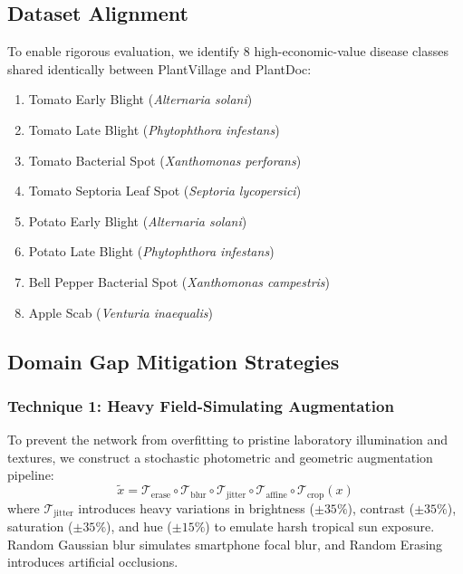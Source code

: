 \documentclass[twoside,a4paper,11pt]{article}
\begin{document}
\subsection{Dataset Alignment}
To enable rigorous evaluation, we identify 8 high-economic-value disease classes shared identically between PlantVillage and PlantDoc:
\begin{enumerate}
    \item Tomato Early Blight (\textit{Alternaria solani})
    \item Tomato Late Blight (\textit{Phytophthora infestans})
    \item Tomato Bacterial Spot (\textit{Xanthomonas perforans})
    \item Tomato Septoria Leaf Spot (\textit{Septoria lycopersici})
    \item Potato Early Blight (\textit{Alternaria solani})
    \item Potato Late Blight (\textit{Phytophthora infestans})
    \item Bell Pepper Bacterial Spot (\textit{Xanthomonas campestris})
    \item Apple Scab (\textit{Venturia inaequalis})
\end{enumerate}

\subsection{Domain Gap Mitigation Strategies}

\subsubsection{Technique 1: Heavy Field-Simulating Augmentation}
To prevent the network from overfitting to pristine laboratory illumination and textures, we construct a stochastic photometric and geometric augmentation pipeline:
\begin{equation}
\tilde{x} = \mathcal{T}_{\text{erase}} \circ \mathcal{T}_{\text{blur}} \circ \mathcal{T}_{\text{jitter}} \circ \mathcal{T}_{\text{affine}} \circ \mathcal{T}_{\text{crop}}(x)
\end{equation}
where $\mathcal{T}_{\text{jitter}}$ introduces heavy variations in brightness ($\pm 35\%$), contrast ($\pm 35\%$), saturation ($\pm 35\%$), and hue ($\pm 15\%$) to emulate harsh tropical sun exposure. Random Gaussian blur simulates smartphone focal blur, and Random Erasing introduces artificial occlusions.
\end{document}
